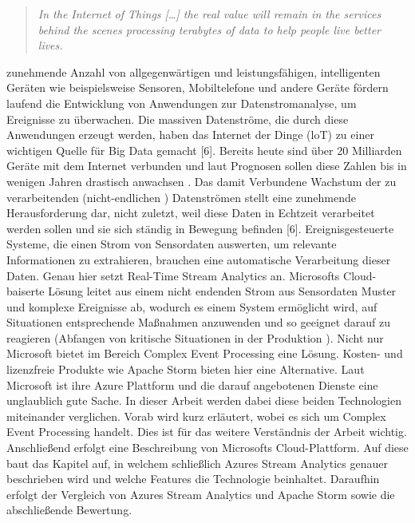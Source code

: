 
\begin{quote} \textit{\glqq In the Internet of Things […] the real value will remain in the services behind the scenes processing terabytes of data to help people live better lives. \grqq~}\cite{Floarea.2014}\\ \end{quote} 

 zunehmende Anzahl von allgegenwärtigen und leistungsfähigen, intelligenten Geräten wie beispielsweise Sensoren, Mobiltelefone und andere Geräte fördern laufend die Entwicklung von Anwendungen zur Datenstromanalyse, um Ereignisse zu überwachen. Die massiven Datenströme, die durch diese Anwendungen erzeugt werden, haben das Internet der Dinge (loT) zu einer wichtigen Quelle für Big Data gemacht [6]. Bereits heute sind über 20 Milliarden Geräte mit dem Internet verbunden und laut Prognosen sollen diese Zahlen bis in wenigen Jahren drastisch anwachsen \cite{Statista.2017}. Das damit Verbundene Wachstum der zu verarbeitenden (nicht-endlichen \cite{Mock.2005}) Datenströmen stellt eine zunehmende Herausforderung dar, nicht zuletzt, weil diese Daten in Echtzeit verarbeitet werden sollen und sie sich ständig in Bewegung befinden [6]. Ereignisgesteuerte Systeme, die einen Strom von Sensordaten auswerten, um relevante Informationen zu extrahieren, brauchen eine automatische Verarbeitung dieser Daten. Genau hier setzt Real-Time Stream Analytics an. Microsofts Cloud-baiserte Lösung leitet aus einem nicht endenden Strom aus Sensordaten Muster und komplexe Ereignisse ab, wodurch es einem System ermöglicht wird, auf Situationen entsprechende Maßnahmen anzuwenden und so geeignet darauf zu reagieren (Abfangen von kritische Situationen in der Produktion \cite{rcrwireless.2016}). Nicht nur Microsoft bietet im Bereich Complex Event Processing eine Lösung. Kosten- und lizenzfreie Produkte wie Apache Storm bieten hier eine Alternative. Laut Microsoft ist ihre Azure Plattform und die darauf angebotenen Dienste eine unglaublich gute Sache. In dieser Arbeit werden dabei diese beiden Technologien miteinander verglichen. Vorab wird kurz erläutert, wobei es sich um Complex Event Processing handelt. Dies ist für das weitere Verständnis der Arbeit wichtig. Anschließend erfolgt eine Beschreibung von Microsofts Cloud-Plattform. Auf diese baut das Kapitel auf, in welchem schließlich Azures Stream Analytics genauer beschrieben wird und welche Features die Technologie beinhaltet. Daraufhin erfolgt der Vergleich von Azures Stream Analytics und Apache Storm sowie die abschließende Bewertung. 